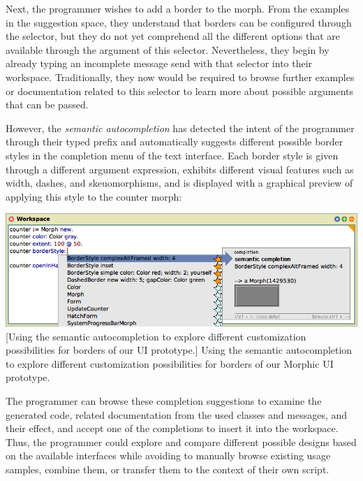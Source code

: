Next, the programmer wishes to add a border to the morph.
From the examples in the suggestion space, they understand that borders can be configured through the  selector, but they do not yet comprehend all the different options that are available through the argument of this selector.
Nevertheless, they begin by already typing an incomplete message send with that selector into their workspace.
Traditionally, they now would be required to browse further examples or documentation related to this selector to learn more about possible arguments that can be passed.

However, the \emph{semantic autocompletion} has detected the intent of the programmer through their typed prefix and automatically suggests different possible border styles in the completion menu of the text interface.
Each border style is given through a different argument expression, exhibits different visual features such as width, dashes, and skeuomorphisms, and is displayed with a graphical preview of applying this style to the counter morph:

\begin{center}
	\includegraphics[width=\linewidth]{01_suggestions/semantic_autocompletion.png} %
	[Using the semantic autocompletion to explore different customization possibilities for borders of our UI prototype.]{
		Using the semantic autocompletion to explore different customization possibilities for borders of our Morphic UI prototype.
	}
\end{center}

The programmer can browse these completion suggestions to examine the generated code, related documentation from the used classes and messages, and their effect, and accept one of the completions to insert it into the workspace.
Thus, the programmer could explore and compare different possible designs based on the available interfaces while avoiding to manually browse existing usage samples, combine them, or transfer them to the context of their own script.

